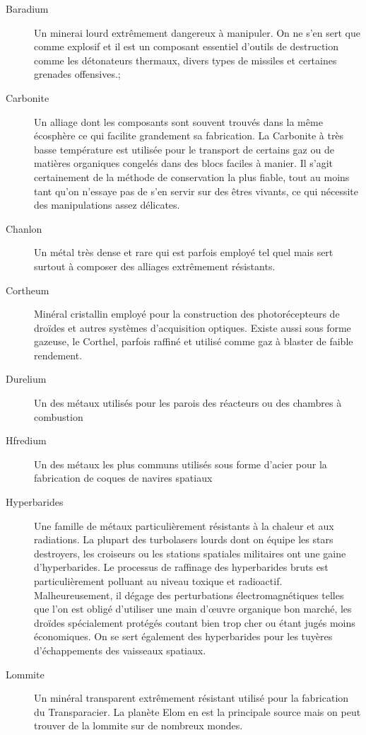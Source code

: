 \documentclass[twoside]{article}
\begin{document}
\begin{description}
	\item[Baradium] Un minerai lourd extrêmement dangereux à manipuler. On ne s'en sert que comme explosif et il est un composant essentiel d'outils de destruction comme les détonateurs thermaux, divers types de missiles et certaines grenades offensives.;
	\item[Carbonite] Un alliage dont les composants sont souvent trouvés dans la même écosphère ce qui facilite grandement sa fabrication. La Carbonite à très basse température est utilisée pour le transport de certains gaz ou de matières organiques congelés dans des blocs faciles à manier. Il s'agit certainement de la méthode de conservation la plus fiable, tout au moins tant qu'on n'essaye pas de s'en servir sur des êtres vivants, ce qui nécessite des manipulations assez délicates.
	\item[Chanlon] Un métal très dense et rare qui est parfois employé tel quel mais sert surtout à composer des alliages extrêmement résistants.
	\item[Cortheum] Minéral cristallin employé pour la construction des photorécepteurs de droïdes et autres systèmes d'acquisition optiques. Existe aussi sous forme gazeuse, le Corthel, parfois raffiné et utilisé comme gaz à blaster de faible rendement.
	\item[Durelium] Un des métaux utilisés pour les parois des réacteurs ou des chambres à combustion
	\item[Hfredium] Un des métaux les plus communs utilisés sous forme d'acier pour la fabrication de coques de navires spatiaux
	\item[Hyperbarides] Une famille de métaux particulièrement résistants à la chaleur et aux radiations. La plupart des turbolasers lourds dont on équipe les stars destroyers, les croiseurs ou les stations spatiales militaires ont une gaine d'hyperbarides. Le processus de raffinage des hyperbarides bruts est particulièrement polluant au niveau toxique et radioactif. Malheureusement, il dégage des perturbations électromagnétiques telles que l'on est obligé d'utiliser une main d'\oe uvre organique bon marché, les droïdes spécialement protégés coutant bien trop cher ou étant jugés moins économiques. On se sert également des hyperbarides pour les tuyères d'échappements des vaisseaux spatiaux.
	\item[Lommite] Un minéral transparent extrêmement résistant utilisé pour la fabrication du Transparacier. La planète Elom en est la principale source mais on peut trouver de la lommite sur de nombreux mondes.

\end{description}
\end{document}
